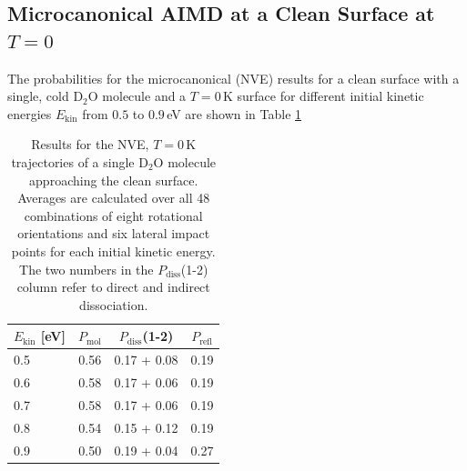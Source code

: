 \documentclass[11pt,DIV=13,BCOR=5mm,a4paper,headinclude]{scrbook}
\begin{document}
\subsection{Microcanonical AIMD at a Clean Surface at $T=0$}
The probabilities for the microcanonical (NVE) results for a clean surface with a single, cold D$_2$O molecule and a $T=0\,$K surface for different initial kinetic energies $E_\textrm{kin}$ from $0.5$ to $0.9\,$eV are shown in Table \ref{tab:mic_ekin}

\begin{table}[!h]
 \centering
  \caption{Results for the NVE, $T=0\,$K trajectories of a single D$_2$O molecule approaching the clean surface.
Averages are calculated over all 48 combinations of eight rotational orientations and six lateral impact points for each initial kinetic energy. The two numbers in the $P_\textrm{diss}$(1-2) column refer to direct and indirect dissociation.}
%
 \begin{tabular}{l|ccc}
\toprule
 $E_\textrm{kin}$ [eV]&$P_\textrm{mol}$ & $P_\textrm{diss}$(1-2) & $P_\textrm{refl}$ \\\midrule
 0.5 & 0.56& 0.17 + 0.08& 0.19\\
 0.6 & 0.58& 0.17 + 0.06& 0.19\\
 0.7 & 0.58& 0.17 + 0.06& 0.19\\
 0.8 & 0.54& 0.15 + 0.12& 0.19\\
 0.9 & 0.50& 0.19 + 0.04& 0.27\\\bottomrule
\end{tabular}
 \label{tab:mic_ekin}
\end{table}
%
\end{document}
